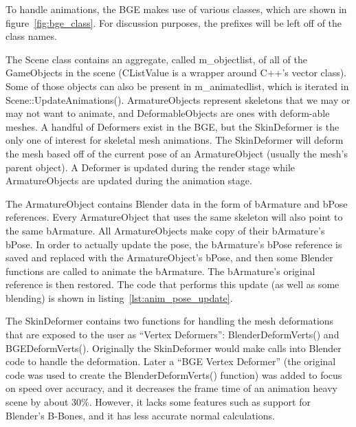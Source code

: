 
To handle animations, the BGE makes use of various classes, which are shown in figure~\ref{fig:bge_class}.
For discussion purposes, the prefixes will be left off of the class names.


The Scene class contains an aggregate, called m\_objectlist, of all of the GameObjects in the scene (CListValue is a wrapper around C++'s vector class).
Some of those objects can also be present in m\_animatedlist, which is iterated in Scene::UpdateAnimations().
ArmatureObjects represent skeletons that we may or may not want to animate, and DeformableObjects are ones with deform-able meshes.
A handful of Deformers exist in the BGE, but the SkinDeformer is the only one of interest for skeletal mesh animations.
The SkinDeformer will deform the mesh based off of the current pose of an ArmatureObject (usually the mesh's parent object).
A Deformer is updated during the render stage while ArmatureObjects are updated during the animation stage.

The ArmatureObject contains Blender data in the form of bArmature and bPose references.
Every ArmatureObject that uses the same skeleton will also point to the same bArmature.
All ArmatureObjects make copy of their bArmature's bPose.
In order to actually update the pose, the bArmature's bPose reference is saved and replaced with the ArmatureObject's bPose, and then some Blender functions are called to animate the bArmature.
The bArmature's original reference is then restored.
The code that performs this update (as well as some blending) is shown in listing~\ref{lst:anim_pose_update}.


The SkinDeformer contains two functions for handling the mesh deformations that are exposed to the user as ``Vertex Deformers'': BlenderDeformVerts() and BGEDeformVerts().
Originally the SkinDeformer would make calls into Blender code to handle the deformation.
Later a ``BGE Vertex Deformer'' (the original code was used to create the BlenderDeformVerts() function) was added to focus on speed over accuracy, and it decreases the frame time of an animation heavy scene by about 30\%.
However, it lacks some features such as support for Blender's B-Bones, and it has less accurate normal calculations.

